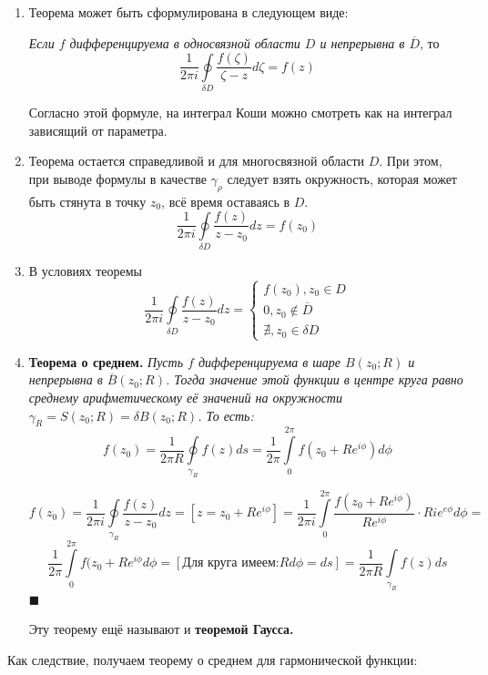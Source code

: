 \documentclass[a4paper, 12pt]{report}
\newenvironment{Proof}
{\par\noindent{\bf Доказательство.}}
{\hfill$\scriptstyle\blacksquare$}
\begin{document}
\begin{enumerate}
  \item Теорема может быть сформулирована в следующем виде:
  
  \textit{Если $f$ дифференцируема в односвязной области $D$ и непрерывна в $\overline{D}$}, то
  \[
    \frac{1}{2\pi i} \oint\limits_{\delta D}\frac{f(\zeta)}{\zeta - z}d\zeta = f(z)
  \]
  
  Согласно этой формуле, на интеграл Коши можно смотреть как на интеграл зависящий от параметра.
  
  \item Теорема остается справедливой и для многосвязной области $D$. При этом, при выводе формулы в качестве $\gamma_\rho$ следует взять окружность, которая может быть стянута в точку $z_0$, всё время оставаясь в $D$.
  \[
    \frac{1}{2\pi i} \oint\limits_{\delta D}\frac{f(z)}{z - z_0}dz = f(z_0)
  \]
  
  \item В условиях теоремы
  \[
    \frac{1}{2\pi i} \oint\limits_{\delta D}\frac{f(z)}{z - z_0}dz = 
    \begin{cases}
    f(z_0), z_0 \in D\\
    0, z_0 \notin \overline{D}\\
    \nexists, z_0 \in \delta D
    \end{cases}
  \]
  
  \item
  \textbf{Теорема о среднем.} \quad
  \textit{Пусть $f$ дифференцируема в шаре $B(z_0; R)$ и непрерывна в $\overline{B}(z_0; R)$. Тогда значение этой функции в центре круга равно среднему арифметическому её значений на окружности $\gamma_R = S(z_0; R)=\delta B(z_0; R)$. То есть:
  \[
    f(z_0) = \frac{1}{2\pi R}\oint\limits_{\gamma_R}f(z)ds = \frac{1}{2\pi}\int\limits_{0}^{2\pi}f(z_0 + R e^{i\phi})d\phi
  \]}
  \begin{Proof}
  \[
    f(z_0) = \frac{1}{2\pi i}\oint\limits_{\gamma_R}\frac{f(z)}{z-z_0}dz = [z=z_0 + R e^{i\phi}] = \frac{1}{2\pi i}\int\limits_{0}^{2\pi}\frac{f(z_0+R e^{i\phi})}{R e^{i\phi}}\cdot R i e^{e\phi}d\phi = 
  \]
  \[
    \frac{1}{2\pi}\int\limits_{0}^{2\pi}f(z_0 + R e^{i\phi}d\phi = [\text{Для круга имеем:} Rd\phi = ds] = \frac{1}{2\pi R}\int\limits_{\gamma_R}f(z)ds
  \]
  \end{Proof}
  
  Эту теорему ещё называют и \textbf{теоремой Гаусса.}
  \end{enumerate}
  
  Как следствие, получаем теорему о среднем для гармонической функции:
  
\end{document}
